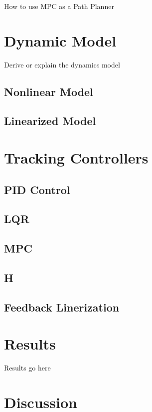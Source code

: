 \documentclass[journal]{IEEEtran}
\begin{document}
How to use MPC as a Path Planner

\section{Dynamic Model}

Derive or explain the dynamics model

\subsection{Nonlinear Model}

\subsection{Linearized Model}

\section{Tracking Controllers}

 \subsection{PID Control}

 \subsection{LQR}

 \subsection{MPC}

 \subsection{H \infity}

 \subsection{Feedback Linerization}

 \section{Results}

Results go here

\section{Discussion}
\end{document}
